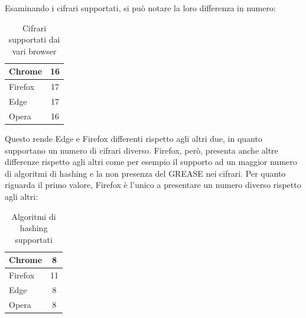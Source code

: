 Esaminando i cifrari supportati, si può notare la loro differenza in numero:
\\
\begin{table}[h]
	\centering
	\begin{tabular}{| l | c |}
		\hline
		\rowcolor{yellow!10}Chrome & 16
		\\
		\hline
		\rowcolor{orange!10}Firefox & 17
		\\
		\hline
		\rowcolor{blue!10}Edge & 17
		\\
		\hline
		\rowcolor{red!10}Opera & 16
		\\
		\hline
		
	\end{tabular}
	\caption{Cifrari supportati dai vari browser}
	\label{tab:cifrari}
\end{table}
Questo rende Edge e Firefox differenti rispetto agli altri due, in quanto supportano un numero di cifrari diverso. Firefox, però, presenta anche altre differenze rispetto agli altri come per esempio il supporto ad un maggior numero di algoritmi di hashing e la non presenza del GREASE nei cifrari. 
Per quanto riguarda il primo valore, Firefox è l'unico a presentare un numero diverso rispetto agli altri:

\begin{table}[H]
	\centering
	\begin{tabular}{| l | c |}
		\hline
		\rowcolor{yellow!10}Chrome & 8
		\\
		\hline
		\rowcolor{orange!10}Firefox & 11
		\\
		\hline
		\rowcolor{blue!10}Edge & 8
		\\
		\hline
		\rowcolor{red!10}Opera & 8
		\\
		\hline
		
	\end{tabular}
	\caption{Algoritmi di hashing supportati}
	\label{tab:hash}
\end{table}

